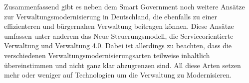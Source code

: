 Zusammenfassend gibt es neben dem Smart Government noch weitere Ansätze zur Verwaltungsmodernisierung in Deutschland, die ebenfalls zu einer effizienteren und bürgernahen Verwaltung beitragen können. 
Diese Ansätze umfassen unter anderem das Neue Steuerungsmodell, die Serviceorientierte Verwaltung und Verwaltung 4.0.
Dabei ist allerdings zu beachten, dass die verschiedenen Verwaltungsmodernisierungsarten teilweise inhaltlich übereinstimmen und nicht ganz klar abzugrenzen sind.
All diese Arten setzen mehr oder weniger auf Technologien um die Verwaltung zu Modernisieren.